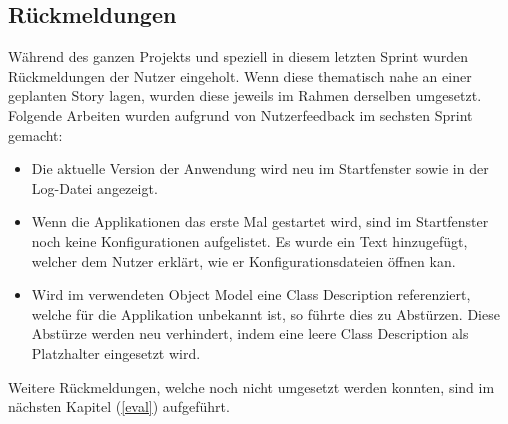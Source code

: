 \subsection{Rückmeldungen}
Während des ganzen Projekts und speziell in diesem letzten Sprint wurden Rückmeldungen der Nutzer eingeholt.
Wenn diese thematisch nahe an einer geplanten Story lagen, wurden diese jeweils im Rahmen derselben umgesetzt.
Folgende Arbeiten wurden aufgrund von Nutzerfeedback im sechsten Sprint gemacht:
\begin{itemize}
   \item Die aktuelle Version der Anwendung wird neu im Startfenster sowie in der Log-Datei angezeigt.
   \item Wenn die Applikationen das erste Mal gestartet wird, sind im Startfenster noch keine Konfigurationen aufgelistet.
Es wurde ein Text hinzugefügt, welcher dem Nutzer erklärt, wie er Konfigurationsdateien öffnen kan.
   \item Wird im verwendeten Object Model eine Class Description referenziert, welche für die Applikation unbekannt ist, so führte dies zu Abstürzen.
Diese Abstürze werden neu verhindert, indem eine leere Class Description als Platzhalter eingesetzt wird.
\end{itemize}
Weitere Rückmeldungen, welche noch nicht umgesetzt werden konnten, sind im nächsten Kapitel (\ref{eval}) aufgeführt.









